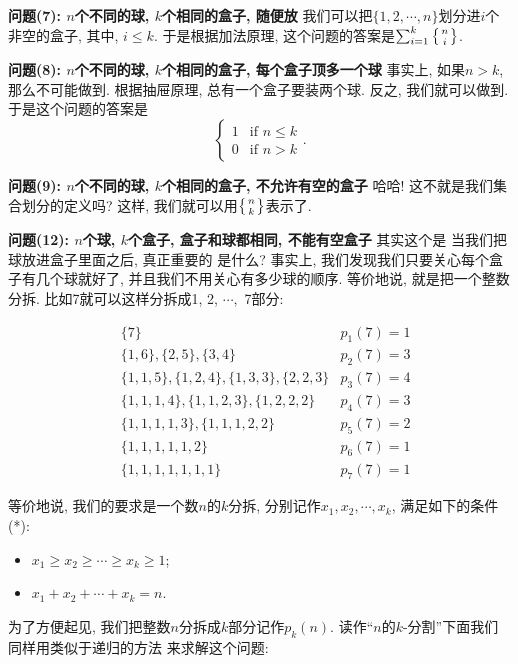 \textbf{问题(7): $n$个不同的球, $k$个相同的盒子, 随便放} 我们可以把$\{1,2,\cdots,n\}$划分进$i$个非空的盒子,
其中, $i\leq k$. 于是根据加法原理, 这个问题的答案是$\sum_{i=1}^{k}\left\{{n \atop i}\right\}$.

\textbf{问题(8): $n$个不同的球, $k$个相同的盒子, 每个盒子顶多一个球} 事实上, 如果$n>k$, 那么不可能做到.
根据抽屉原理, 总有一个盒子要装两个球. 反之, 我们就可以做到. 于是这个问题的答案是$$\begin{cases}1 & \text{if }n\leq k\\ 0& \text{if }n>k\end{cases}.$$

\textbf{问题(9): $n$个不同的球, $k$个相同的盒子, 不允许有空的盒子  } 哈哈! 这不就是我们集合划分的定义吗?
这样, 我们就可以用$\left\{{n \atop k}\right\}$表示了.

\textbf{问题(12): $n$个球, $k$个盒子, 盒子和球都相同, 不能有空盒子  } 其实这个是
当我们把球放进盒子里面之后, 真正重要的
是什么? 事实上, 我们发现我们只要关心每个盒子有几个球就好了, 并且我们不用关心有多少球的顺序.
等价地说, 就是把一个整数分拆. 比如7就可以这样分拆成1, 2, $\cdots,$ 7部分:

$$
    \begin{aligned}
         & \{7\}
         & p_1(7)=1                                   \\
         & \{1,6\},\{2,5\},\{3,4\}
         & p_2(7)=3                                   \\
         & \{1,1,5\}, \{1,2,4\}, \{1,3,3\}, \{2,2,3\}
         & p_3(7)=4                                   \\
         & \{1,1,1,4\},\{1,1,2,3\}, \{1,2,2,2\}
         & p_4(7)=3                                   \\
         & \{1,1,1,1,3\},\{1,1,1,2,2\}
         & p_5(7)=2                                   \\
         & \{1,1,1,1,1,2\}
         & p_6(7)=1                                   \\
         & \{1,1,1,1,1,1,1\}
         & p_7(7)=1
    \end{aligned}
$$

等价地说, 我们的要求是一个数$n$的$k$分拆, 分别记作$x_1, x_2, \cdots, x_k$, 满足如下的条件(*):
\begin{itemize}[noitemsep]
    \item  $x_1\ge x_2\ge\cdots\ge x_k\ge 1$;
    \item $x_1+x_2+\cdots+x_k=n$.
\end{itemize}

为了方便起见, 我们把整数$n$分拆成$k$部分记作$p_k(n)$. 读作``$n$的$k$-分割''下面我们同样用类似于递归的方法
来求解这个问题:

